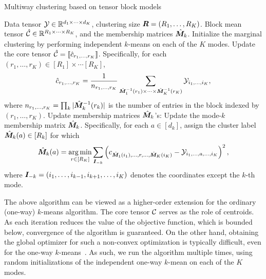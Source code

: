 \documentclass{article}
\begin{document}
\begin{algorithm}
\caption{Multiway clustering based on tensor block models}\label{alg:B}
\begin{algorithmic}[1]
\INPUT Data tensor $\mathcal{Y}\in \mathbb{R}^{d_1\times \cdots \times d_K}$, clustering size $\bm{R}=(R_1,\ldots,R_K)$.
\OUTPUT Block mean tensor $\hat {\mathcal{C}}\in\mathbb{R}^{R_1\times \cdots\times R_K}$, and the membership matrices $\hat {\bm M}_k$. 
\State Initialize the marginal clustering by performing independent $k$-means on each of the $K$ modes.
\Repeat
\State Update the core tensor $\hat {\mathcal{C}}=\llbracket \hat c_{r_1,\ldots,r_K} \rrbracket$. Specifically, for each $(r_1,\ldots,r_K)\in[R_1]\times \cdots [R_K]$,
\begin{equation}\label{eq:ols}
\hat c_{r_1,\ldots,r_K}={1\over n_{r_1,\ldots,r_K}}\sum_{\hat {\bm M}_1^{-1}(r_1)\times\cdots\times \hat {\bm M}_K^{-1}(r_K)}{\mathcal{Y}_{i_1,\ldots,i_K}},
\end{equation}
where $n_{r_1,\ldots,r_K}=\prod_k|\hat {\bm M}_k^{-1}(r_k)|$ is the number of entries in the block indexed by $(r_1,\ldots,r_K)$. 
\State Update membership matrices $\hat {\bm M}_k$'s:
\State Update the mode-$k$ membership matrix $\hat {\bm M}_k$. Specifically, for each $a\in[d_k]$, assign the cluster label $\hat {\bm M}_k(a)\in[R_k]$ for which	\[
\hat {\bm M}_k(a)=\operatorname*{arg\,min}_{r\in[R_K]}\sum_{\bm I_{-k}}\left(c_{\hat {\bm M}_1(i_1),\ldots,r,\ldots,\hat {\bm M}_K(i_K)}-\mathcal{Y}_{i_1,\ldots,a,\ldots,i_K}\right)^2,
\]
where $\bm I_{-k}=(i_1,\ldots,i_{k-1},i_{k+1},\ldots,i_K)$ denotes the coordinates except the $k$-th mode. 
\EndFor
{} 
\end{algorithmic}
\end{algorithm}
The above algorithm can be viewed as a higher-order extension for the ordinary (one-way) $k$-means algorithm. The core tensor $\mathcal{C}$ serves as the role of centroids. As each iteration reduces the value of the objective function, which is bounded below, convergence of the algorithm is guaranteed. On the other hand, obtaining the global optimizer for such a non-convex optimization is typically difficult, even for the one-way $k$-means~\cite{aloise2009np}. As such, we run the algorithm multiple times, using random initializations of the independent one-way $k$-mean on each of the $K$ modes. 
\end{document}
